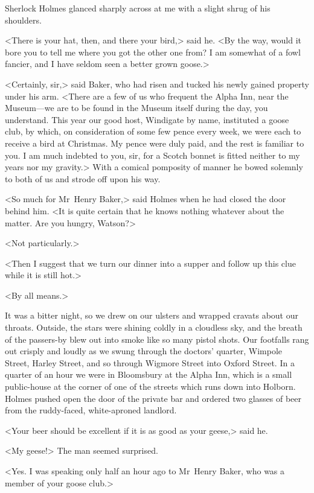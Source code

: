 Sherlock Holmes glanced sharply across at me with a slight shrug of his shoulders.

<There is your hat, then, and there your bird,> said he. <By the way, would it bore you to tell me where you got the other one from? I am somewhat of a fowl fancier, and I have seldom seen a better grown goose.>

<Certainly, sir,> said Baker, who had risen and tucked his newly gained property under his arm. <There are a few of us who frequent the Alpha Inn, near the Museum—we are to be found in the Museum itself during the day, you understand. This year our good host, Windigate by name, instituted a goose club, by which, on consideration of some few pence every week, we were each to receive a bird at Christmas. My pence were duly paid, and the rest is familiar to you. I am much indebted to you, sir, for a Scotch bonnet is fitted neither to my years nor my gravity.> With a comical pomposity of manner he bowed solemnly to both of us and strode off upon his way.

<So much for Mr~Henry Baker,> said Holmes when he had closed the door behind him. <It is quite certain that he knows nothing whatever about the matter. Are you hungry, Watson?>

<Not particularly.>

<Then I suggest that we turn our dinner into a supper and follow up this clue while it is still hot.>

<By all means.>

It was a bitter night, so we drew on our ulsters and wrapped cravats about our throats. Outside, the stars were shining coldly in a cloudless sky, and the breath of the passers-by blew out into smoke like so many pistol shots. Our footfalls rang out crisply and loudly as we swung through the doctors' quarter, Wimpole Street, Harley Street, and so through Wigmore Street into Oxford Street. In a quarter of an hour we were in Bloomsbury at the Alpha Inn, which is a small public-house at the corner of one of the streets which runs down into Holborn. Holmes pushed open the door of the private bar and ordered two glasses of beer from the ruddy-faced, white-aproned landlord.

<Your beer should be excellent if it is as good as your geese,> said he.

<My geese!> The man seemed surprised.

<Yes. I was speaking only half an hour ago to Mr~Henry Baker, who was a member of your goose club.>

